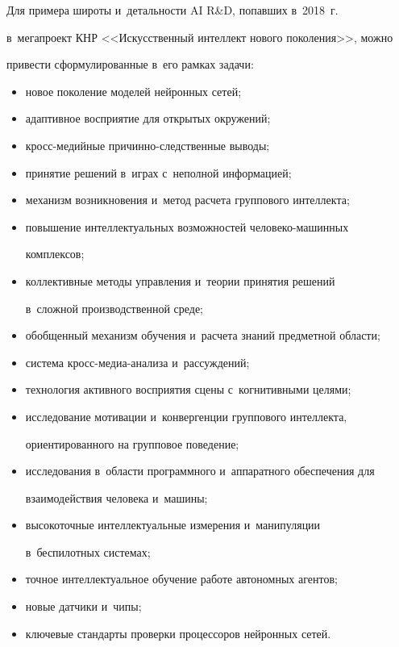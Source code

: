      Для примера широты и~детальности AI R\&D, по\-пав\-ших в~2018~г.\ 


в~мегапроект КНР <<Искусственный интеллект нового поколения>>, можно 


привести сформулированные в~его рам\-ках задачи:


     \begin{itemize}


\item новое поколение моделей нейронных сетей;


\item адаптивное восприятие для открытых окружений;


\item кросс-медийные при\-чин\-но-след\-ст\-вен\-ные выводы;


\item принятие решений в~играх с~неполной информацией;


\item механизм возникновения и~метод расчета группового интеллекта;


\item повышение интеллектуальных возможностей че\-ло\-ве\-ко-ма\-шин\-ных 


комплексов;


\item коллективные методы управления и~тео\-рии принятия решений 


в~слож\-ной производственной среде;


\item обобщенный механизм обучения и~расчета знаний предметной об\-ласти;


\item система кросс-медиа-ана\-ли\-за и~рассуждений;


\item технология активного восприятия сцены с~когнитивными целями;


\item исследование мотивации и~конвергенции группового интеллекта, 


ориентированного на групповое поведение;


\item исследования в~об\-ласти программного и~аппаратного обеспечения для 


взаимодействия человека и~машины;


\item высокоточные интеллектуальные измерения и~манипуляции 


в~беспилотных сис\-те\-мах;


\item точное интеллектуальное обучение работе автономных агентов;


\item новые датчики и~чипы;


\item ключевые стандарты проверки процессоров нейронных сетей.


\end{itemize}


